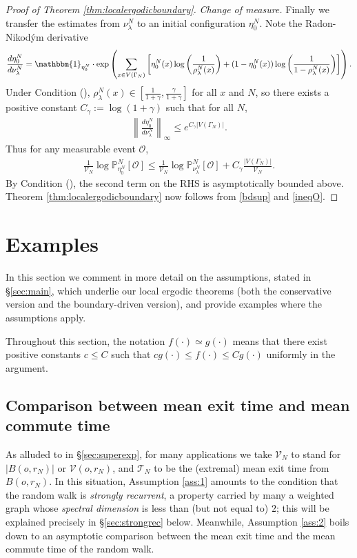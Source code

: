 \documentclass[11pt]{amsart}
\theoremstyle{plain}
\theoremstyle{definition}
\theoremstyle{remark}
\begin{document}
\begin{proof}[Proof of Theorem \ref{thm:localergodicboundary}]
\emph{Change of measure.}
Finally we transfer the estimates from $\nu_\lambda^N$ to an initial configuration $\eta_0^N$.
Note the Radon-Nikod\'ym derivative
\[
 \frac{d \eta^N_0}{d\nu_\lambda^N} =\mathbbm{1}_{\eta_0^N}\cdot\exp\left(\sum_{x\in V(\Gamma_N)} \left[\eta_0^N(x) \log\left(\frac{1}{\rho_\lambda^N(x)} \right) + (1-\eta_0^N(x))\log\left(\frac{1}{1-\rho_\lambda^N(x)}\right) \right]\right).
\]
Under Condition (), $\rho_\lambda^N(x) \in \left[\frac{1}{1+\gamma}, \frac{\gamma}{1+\gamma}\right]$ for all $x$ and $N$, so there exists a positive constant $C_\gamma := \log(1+\gamma)$ such that for all $N$,
\begin{align*}
\left\|\frac{d \eta_0^N}{d\nu_\lambda^N}\right\|_\infty \leq e^{C_\gamma |V(\Gamma_N)|}.
\end{align*}
Thus for any measurable event $\mathcal{O}$,
\begin{align}
\label{ineqO}
\frac{1}{\mathcal{V}_N} \log \mathbb{P}^N_{\eta_0^N}[\mathcal{O}] \leq \frac{1}{\mathcal{V}_N} \log\mathbb{P}^N_{\nu^N_\lambda}[\mathcal{O}] + C_\gamma \frac{|V(\Gamma_N)|}{\mathcal{V}_N}.
\end{align}
By Condition (), the second term on the RHS is asymptotically bounded above. Theorem \ref{thm:localergodicboundary} now follows from \eqref{bdsup} and \eqref{ineqO}.
\end{proof}
 

\section{Examples}
\label{sec:examples}

In this section we comment in more detail on the assumptions, stated in \S\ref{sec:main}, which underlie our local ergodic theorems (both the conservative version and the boundary-driven version), and provide examples where the assumptions apply. 

Throughout this section, the notation $f(\cdot) \simeq g(\cdot)$ means that there exist positive constants $c\leq C$ such that $cg(\cdot) \leq f(\cdot) \leq Cg(\cdot)$ uniformly in the argument.

\subsection{Comparison between mean exit time and mean commute time}

As alluded to in \S\ref{sec:superexp}, for many applications we take $\mathcal{V}_N$ to stand for $|B(o, r_N)|$ or $\mathcal{V}(o, r_N)$, and $\mathcal{T}_N$ to be the (extremal) mean exit time from $B(o,r_N)$. In this situation, Assumption \ref{ass:1} amounts to the condition that the random walk is \emph{strongly recurrent}, a property carried by many a weighted graph whose \emph{spectral dimension} is less than (but not equal to) $2$; this will be explained precisely in \S\ref{sec:strongrec} below. Meanwhile, Assumption \ref{ass:2} boils down to an asymptotic comparison between the mean exit time and the mean commute time of the random walk. 
\end{document}
